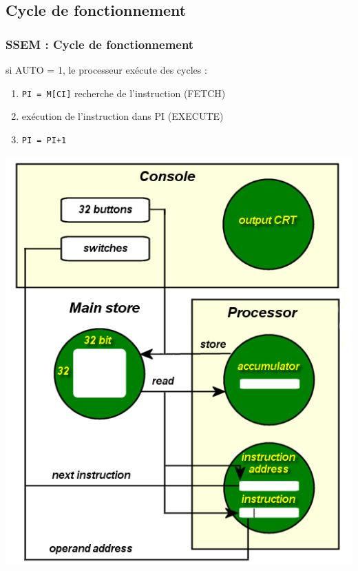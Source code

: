 \documentclass{beamer}
\begin{document}
\subsection{Cycle de fonctionnement}
\begin{frame}
\frametitle{SSEM : Cycle de fonctionnement} 

\begin{multicols}{2}
si AUTO = 1, le processeur exécute des cycles :
\begin{enumerate}
\item \texttt{PI = M[CI]} recherche de l'instruction (\alert{FETCH})
\item exécution de l'instruction dans PI (\alert{EXECUTE})
\item \texttt{PI = PI+1}
\end{enumerate}
\begin{center}
\includegraphics[width=\linewidth]{Historique/BabyArchitecture.png}
\end{center}
\end{multicols}
\end{frame}
\end{document}

